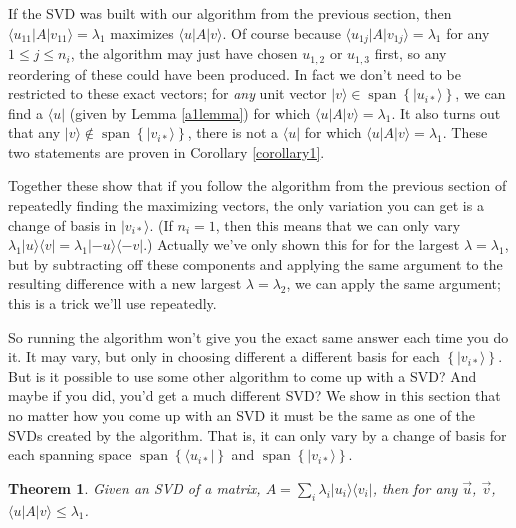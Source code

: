 \documentclass{amsbook}
\newtheorem{theorem}{Theorem}
\begin{document}
If the SVD was built with our algorithm from the previous section, then $\langle u_{11}|A|v_{11}\rangle=\lambda_1$ maximizes $\langle u|A|v\rangle$.  Of course because $\langle u_{1j}|A|v_{1j}\rangle=\lambda_1$ for any $1\leq j\leq n_i$, the algorithm may just have chosen $u_{1,2}$ or $u_{1,3}$ first, so any reordering of these could have been produced.  In fact we don't need to be restricted to these exact vectors; for {\em any} unit vector $|v\rangle\in\operatorname{span}\left\{|u_{i*}\rangle\right\}$, we can find a $\langle u|$ (given by Lemma \ref{a1lemma}) for which $\langle u|A|v\rangle=\lambda_1$.  It also turns out that any $|v\rangle\not\in\operatorname{span}\left\{|v_{i*}\rangle\right\}$, there is not a $\langle u|$ for which $\langle u|A|v\rangle=\lambda_1$.  These two statements are proven in Corollary \ref{corollary1}.

Together these show that if you follow the algorithm from the previous section of repeatedly finding the maximizing vectors, the only variation you can get is a change of basis in $|v_{i*}\rangle$.  (If $n_i=1$, then this means that we can only vary $\lambda_1|u\rangle\langle v|=\lambda_1|-u\rangle\langle -v|$.)  Actually we've only shown this for for the largest $\lambda=\lambda_1$, but by subtracting off these components and applying the same argument to the resulting difference with a new largest $\lambda=\lambda_2$, we can apply the same argument; this is a trick we'll use repeatedly.

So running the algorithm won't give you the exact same answer each time you do it.  It may vary, but only in choosing different a different basis for each $\left\{|v_{i*}\rangle\right\}$.  But is it possible to use some other algorithm to come up with a SVD?  And maybe if you did, you'd get a much different SVD?  We show in this section that no matter how you come up with an SVD it must be the same as one of the SVDs created by the algorithm.  That is, it can only vary by a change of basis for each spanning space $\operatorname{span}\left\{\langle u_{i*}|\right\}$ and $\operatorname{span}\left\{|v_{i*}\rangle\right\}$.

 \begin{theorem}
\label{upperbound}
Given an SVD of a matrix, $A=\sum_i\lambda_i|u_i\rangle\langle v_i|$, then for any $\vec u$, $\vec v$, $\langle u|A|v\rangle\leq\lambda_1$.
 \end{theorem}
\end{document}
